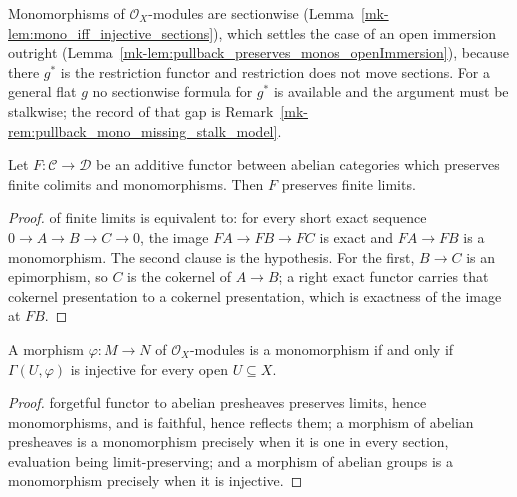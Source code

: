 Monomorphisms of \(\mathcal{O}_X\)-modules are sectionwise
(Lemma~\ref{mk-lem:mono_iff_injective_sections}), which settles the case of an open immersion
outright (Lemma~\ref{mk-lem:pullback_preserves_monos_openImmersion}), because there \(g^*\) is the
restriction functor and restriction does not move sections. For a general flat \(g\) no
sectionwise formula for \(g^*\) is available and the argument must be stalkwise; the record of
that gap is Remark~\ref{mk-rem:pullback_mono_missing_stalk_model}.

\begin{lemma}\label{mk-lem:right_exact_mono_left_exact}
  \leanok

  Let \(F : \mathcal{C} \to \mathcal{D}\) be an additive functor between abelian categories
  which preserves finite colimits and monomorphisms. Then \(F\) preserves finite limits.
\end{lemma}

\begin{proof}
  \leanokPreservation of finite limits is equivalent to: for every short exact sequence
  \(0 \to A \to B \to C \to 0\), the image \(F A \to F B \to F C\) is exact and \(F A \to F B\)
  is a monomorphism. The second clause is the hypothesis. For the first, \(B \to C\) is an
  epimorphism, so \(C\) is the cokernel of \(A \to B\); a right exact functor carries that
  cokernel presentation to a cokernel presentation, which is exactness of the image at \(F B\).
\end{proof}

\begin{lemma}\label{mk-lem:mono_iff_injective_sections}
  \leanok

  A morphism \(\varphi : M \to N\) of \(\mathcal{O}_X\)-modules is a monomorphism if and only if
  \(\Gamma(U, \varphi)\) is injective for every open \(U \subseteq X\).
\end{lemma}

\begin{proof}
  \leanokThe forgetful functor to abelian presheaves preserves limits, hence monomorphisms, and is
  faithful, hence reflects them; a morphism of abelian presheaves is a monomorphism precisely
  when it is one in every section, evaluation being limit-preserving; and a morphism of abelian
  groups is a monomorphism precisely when it is injective.
\end{proof}

